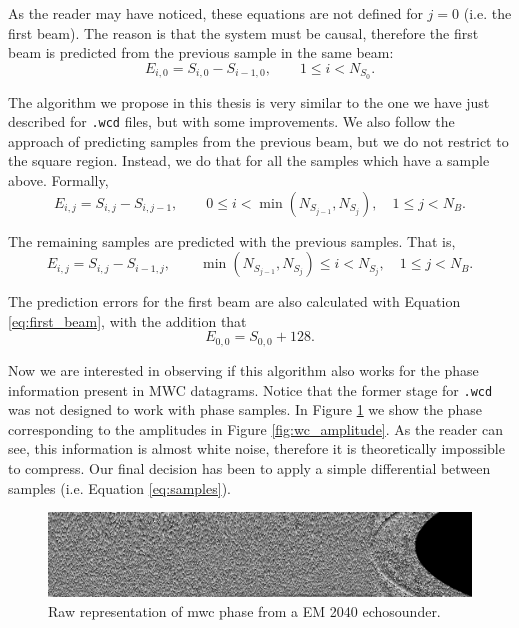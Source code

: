 As the reader may have noticed, these equations are not defined for $j=0$ (i.e. the first beam). The reason is that the system must be causal, therefore the first beam is predicted from the previous sample in the same beam:
\begin{equation} \label{eq:first_beam}
E_{i,0} = S_{i,0} - S_{i-1,0}, \qquad 1 \leq i < N_{S_0}.
\end{equation}

The algorithm we propose in this thesis is very similar to the one we have just described for \texttt{.wcd} files, but with some improvements. We also follow the approach of predicting samples from the previous beam, but we do not restrict to the square region. Instead, we do that for all the samples which have a sample above. Formally,
\begin{equation}
E_{i,j} = S_{i,j} - S_{i,j-1}, \qquad 0 \leq i < \min(N_{S_{j-1}}, N_{S_j}), \quad 1 \leq j < N_B.
\end{equation}

The remaining samples are predicted with the previous samples. That is,
\begin{equation} \label{eq:samples}
E_{i,j} = S_{i,j} - S_{i-1,j}, \qquad \min(N_{S_{j-1}}, N_{S_j}) \leq i < N_{S_j}, \quad 1 \leq j < N_B.
\end{equation}

The prediction errors for the first beam are also calculated with Equation \ref{eq:first_beam}, with the addition that
\begin{equation}
E_{0,0} = S_{0,0} + 128.
\end{equation}

Now we are interested in observing if this algorithm also works for the phase information present in MWC datagrams. Notice that the former stage for \texttt{.wcd} was not designed to work with phase samples. In Figure \ref{fig:wc_phase} we show the phase corresponding to the amplitudes in Figure \ref{fig:wc_amplitude}. As the reader can see, this information is almost white noise, therefore it is theoretically impossible to compress. Our final decision has been to apply a simple differential between samples (i.e. Equation \ref{eq:samples}).
\begin{figure}[h!]
	\begin{center}
		\includegraphics[scale=0.334]{images/water_column_ph.png}
	\end{center}
	\caption{Raw representation of \acrshort{mwc} phase from a EM 2040 echosounder.}
	\label{fig:wc_phase}
\end{figure}

